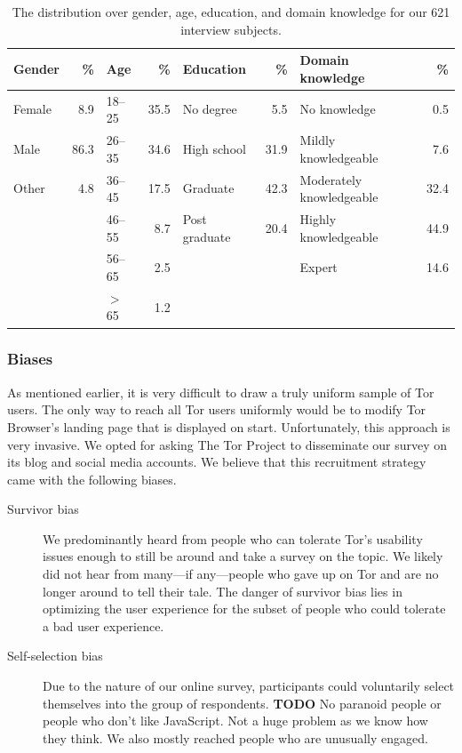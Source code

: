 \begin{table}[t]
	\centering
	\begin{tabular}{l r l r l r l r}
	\toprule
	Gender & \% &
	Age & \% &
	Education & \% &
	Domain knowledge & \% \\
	\midrule
	Female & 8.9  & 18--25   & 35.5 & No degree     & 5.5  & No knowledge             & 0.5  \\
	Male   & 86.3 & 26--35   & 34.6 & High school   & 31.9 & Mildly knowledgeable     & 7.6  \\
	Other  & 4.8  & 36--45   & 17.5 & Graduate      & 42.3 & Moderately knowledgeable & 32.4 \\
	       &      & 46--55   & 8.7  & Post graduate & 20.4 & Highly knowledgeable     & 44.9 \\
	       &      & 56--65   & 2.5  &               &      & Expert                   & 14.6 \\
	       &      & $>$ 65   & 1.2  &               &      & & \\
	\bottomrule
	\end{tabular}
	\caption{The distribution over gender, age, education, and domain knowledge 
	for our 621 interview subjects.}
	\label{tab:survey-demo}
\end{table}


\subsubsection{Biases}

As mentioned earlier, it is very difficult to draw a truly uniform sample of Tor
users.  The only way to reach all Tor users uniformly would be to modify Tor
Browser's landing page that is displayed on start.  Unfortunately, this approach
is very invasive.  We opted for asking The Tor Project to disseminate our survey
on its blog and social media accounts.  We believe that this recruitment
strategy came with the following biases.

\begin{description}
    \item[Survivor bias] We predominantly heard from people who can tolerate
        Tor's usability issues enough to still be around and take a survey on
        the topic.  We likely did not hear from many---if any---people who gave
        up on Tor and are no longer around to tell their tale.  The danger of
        survivor bias lies in optimizing the user experience for the subset of
        people who could tolerate a bad user experience.

    \item[Self-selection bias] Due to the nature of our online survey,
        participants could voluntarily select themselves into the group of
        respondents. \textbf{TODO}
        No paranoid people or people who don't like
        JavaScript.  Not a huge problem as we know how they think.  We also
        mostly reached people who are unusually engaged.
\end{description}

